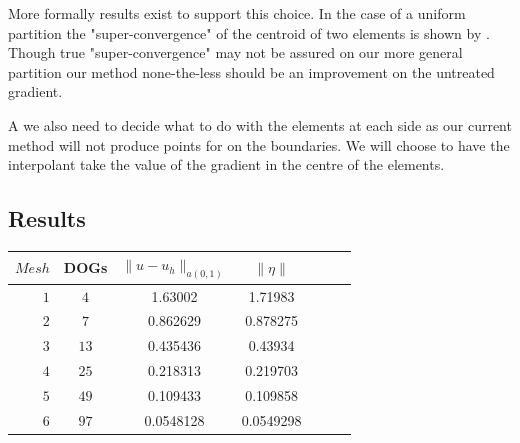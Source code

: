 \documentclass{uonmathreport}
\theoremstyle{definition}
\theoremstyle{problem}
\theoremstyle{theorem}
\begin{document}
More formally results exist to support this choice. In the case of a uniform partition the "super-convergence" of the centroid of two elements is shown by \cite{zlamal1978superconvergence}. Though true "super-convergence" may not be assured on our more general partition our method none-the-less should be an improvement on the untreated gradient. 

A we also need to decide what to do with the elements at each side as our current method will not produce points for on the boundaries. We will choose to have the interpolant take the value of the gradient in the centre of the elements.



\begin{center}
\end{center}

\subsection{Results} \label{subsec:results3}


\begin{center}
  \begin{tabular}{r|cccccc}  \label{table:IndicatorPDE1}
    $Mesh$   & DOGs & $\|u-u_h\|_{a(0,1)}$ & $\|\eta\|$  \\ \hline
    $1$ & $4$ & 1.63002 &  1.71983   \\
    $2$ & $7$ & 0.862629 &  0.878275   \\
    $3$ & $13$ & 0.435436 & 0.43934   \\
	$4$ & $25$ & 0.218313 &  0.219703  \\
    $5$ & $49$ & 0.109433 &  0.109858   \\
    $6$ & $97$ & 0.0548128 &  0.0549298  \\
  \end{tabular}
\end{center}
\end{document}

